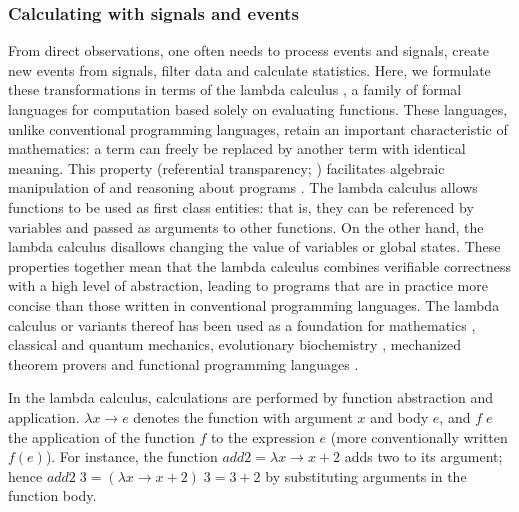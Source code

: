 \documentclass[11pt]{article}
\newcommand{\Varid}[1]{\mathit{#1}}
\begin{document}
\subsubsection*{Calculating with signals and events}

From direct observations, one often needs to process events and
signals, create new events from signals, filter data and calculate
statistics. Here, we formulate these transformations in terms of the
lambda calculus \citep{Church1941}, a family of formal languages for
computation based solely on evaluating functions.  These languages,
unlike conventional programming languages, retain an important
characteristic of mathematics: a term can freely be replaced by
another term with identical meaning.
This property (referential transparency; \citep{Whitehead1927})
facilitates algebraic manipulation of and reasoning about
programs \citep{Bird1996}. The lambda calculus allows functions to be
used as first class entities: that is, they can be referenced by
variables and passed as arguments to other functions. On the other
hand, the lambda calculus disallows changing the value of variables or
global states. These properties together mean that the lambda calculus
combines verifiable correctness with a high level of abstraction,
leading to programs that are in 
practice more concise \citep{Hughes1989} than those written in
conventional programming languages. The lambda calculus or variants
thereof has been used as a foundation for mathematics
\citep{Martin-Lof1985}, classical \citep{Sussman2001} and quantum
\citep{Karczmarczuk2003} mechanics, evolutionary biochemistry
\citep{Fontana1994}, mechanized theorem provers \citep{DeBruijn1968,
  Harrison2009} and functional programming languages
\citep{McCarthy1960}.

In the lambda calculus, calculations are performed by function
abstraction and application. \ensuremath{\lambda \Varid{x}\to \Varid{e}} denotes the function with
argument \ensuremath{\Varid{x}} and body \ensuremath{\Varid{e}}, and \ensuremath{\Varid{f}\;\Varid{e}} the application of the function
\ensuremath{\Varid{f}} to the expression \ensuremath{\Varid{e}} (more conventionally written $f(e)$). For
instance, the function \ensuremath{\Varid{add2}\mathrel{=}\lambda \Varid{x}\to \Varid{x}\mathbin{+}\mathrm{2}} adds two to its argument;
hence \ensuremath{\Varid{add2}\;\mathrm{3}\mathrel{=}(\lambda \Varid{x}\to \Varid{x}\mathbin{+}\mathrm{2})\;\mathrm{3}\mathrel{=}\mathrm{3}\mathbin{+}\mathrm{2}} by substituting arguments in the
function body.
\end{document}
